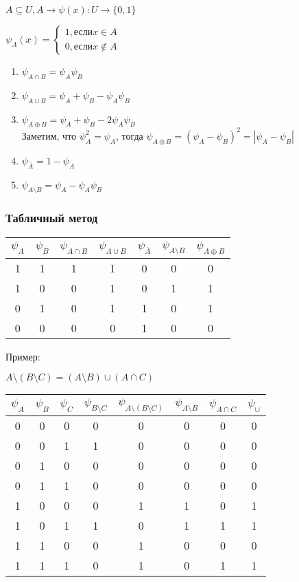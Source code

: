 \documentclass{article}
\begin{document}
$A \subseteq U, A \rightarrow \psi(x): U \rightarrow \{0, 1\}$

$\psi_A(x) = \begin{cases}
	1, \text{если} x \in A\\
	0, \text{если} x \not \in A
\end{cases}$

\begin{enumerate}
	\item $\psi_{A \cap B} = \psi_A\psi_B$
	\item $\psi_{A \cup B} = \psi_A + \psi_B - \psi_A\psi_B$
	\item $\psi_{A \oplus B} = \psi_A + \psi_B - 2\psi_A\psi_B$\\
	Заметим, что $\psi_A^2 = \psi_A$, тогда $\psi_{A \oplus B} = (\psi_A - \psi_B)^2 = |\psi_A - \psi_B|$
	\item $\psi_{\overline{A}} = 1 - \psi_A$
	\item $\psi_{A \setminus B} = \psi_A - \psi_A\psi_B$
\end{enumerate}

\subsubsection{Табличный метод}

\begin{tabular}{c|c||c||c||c||c||c}
	$\psi_A$ & $\psi_B$ & $\psi_{A \cap B}$ &
	$\psi_{A \cup B}$ & $\psi_{\overline{A}}$ &
	$\psi_{A \setminus B}$ & $\psi_{A \oplus B}$ \\
	\hline
	1 & 1 & 1 & 1 & 0 & 0 & 0 \\
	1 & 0 & 0 & 1 & 0 & 1 & 1 \\
	0 & 1 & 0 & 1 & 1 & 0 & 1\\
	0 & 0 & 0 & 0 & 1 & 0 & 0
\end{tabular}

Пример:

$A \setminus (B \setminus C) = (A \setminus B) \cup (A \cap C)$

\begin{tabular}{c|c|c|c|c||c|c|c}
	$\psi_A$ & $\psi_B$ & $\psi_C$ & $\psi_{B \setminus C}$ &
	$\psi_{A \setminus (B \setminus C)}$ &
	$\psi_{A \setminus B}$ & $\psi_{A \cap C}$ & $\psi_\cup$
	\\
	\hline
	0 & 0 & 0 & 0 & 0 & 0 & 0 & 0 \\
	0 & 0 & 1 & 1 & 0 & 0 & 0 & 0 \\
	0 & 1 & 0 & 0 & 0 & 0 & 0 & 0 \\
	0 & 1 & 1 & 0 & 0 & 0 & 0 & 0 \\
	\hline
	1 & 0 & 0 & 0 & 1 & 1 & 0 & 1 \\
	1 & 0 & 1 & 1 & 0 & 1 & 1 & 1 \\
	1 & 1 & 0 & 0 & 1 & 0 & 0 & 0 \\
	1 & 1 & 1 & 0 & 1 & 0 & 1 & 1 \\
\end{tabular}
\end{document}
